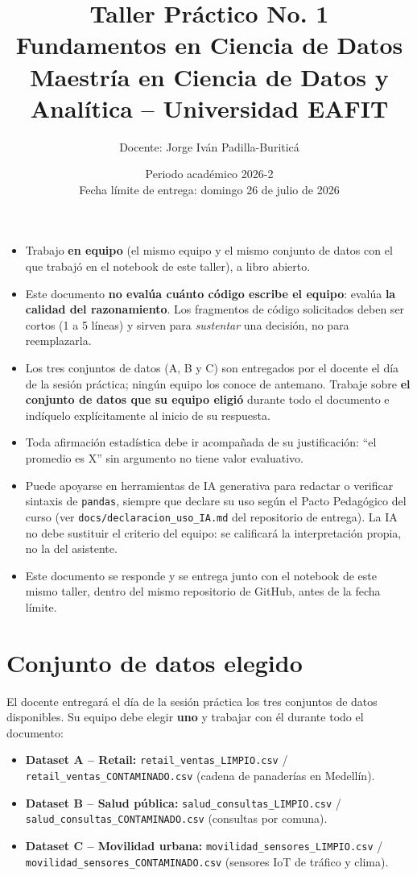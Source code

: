 \documentclass[11pt]{article}
\title{\vspace{-1.5cm}\textbf{Taller Práctico No. 1} \\[0.3em]
\large Fundamentos en Ciencia de Datos \\
\normalsize Maestría en Ciencia de Datos y Analítica -- Universidad EAFIT}
\author{Docente: Jorge Iván Padilla-Buriticá}
\date{Periodo académico 2026-2 \\ Fecha límite de entrega: domingo 26 de julio de 2026}
\begin{document}
\maketitle
\vspace{-1cm}

\begin{contexto}
\begin{itemize}[leftmargin=1.3em]
  \item Trabajo \textbf{en equipo} (el mismo equipo y el mismo conjunto de datos con el que trabajó en el notebook de este taller), a libro abierto.
  \item Este documento \textbf{no evalúa cuánto código escribe el equipo}: evalúa \textbf{la calidad del razonamiento}. Los fragmentos de código solicitados deben ser cortos (1 a 5 líneas) y sirven para \emph{sustentar} una decisión, no para reemplazarla.
  \item Los tres conjuntos de datos (A, B y C) son entregados por el docente el día de la sesión práctica; ningún equipo los conoce de antemano. Trabaje sobre \textbf{el conjunto de datos que su equipo eligió} durante todo el documento e indíquelo explícitamente al inicio de su respuesta.
  \item Toda afirmación estadística debe ir acompañada de su justificación: ``el promedio es X'' sin argumento no tiene valor evaluativo.
  \item Puede apoyarse en herramientas de IA generativa para redactar o verificar sintaxis de \texttt{pandas}, siempre que declare su uso según el Pacto Pedagógico del curso (ver \texttt{docs/declaracion\_uso\_IA.md} del repositorio de entrega). La IA no debe sustituir el criterio del equipo: se calificará la interpretación propia, no la del asistente.
  \item Este documento se responde y se entrega junto con el notebook de este mismo taller, dentro del mismo repositorio de GitHub, antes de la fecha límite.
\end{itemize}
\end{contexto}

\section*{Conjunto de datos elegido}
El docente entregará el día de la sesión práctica los tres conjuntos de datos disponibles.
Su equipo debe elegir \textbf{uno} y trabajar con él durante todo el documento:

\begin{itemize}[leftmargin=1.3em]
  \item \textbf{Dataset A -- Retail:} \texttt{retail\_ventas\_LIMPIO.csv} / \texttt{retail\_ventas\_CONTAMINADO.csv} (cadena de panaderías en Medellín).
  \item \textbf{Dataset B -- Salud pública:} \texttt{salud\_consultas\_LIMPIO.csv} / \texttt{salud\_consultas\_CONTAMINADO.csv} (consultas por comuna).
  \item \textbf{Dataset C -- Movilidad urbana:} \texttt{movilidad\_sensores\_LIMPIO.csv} / \texttt{movilidad\_sensores\_CONTAMINADO.csv} (sensores IoT de tráfico y clima).
\end{itemize}
\end{document}
